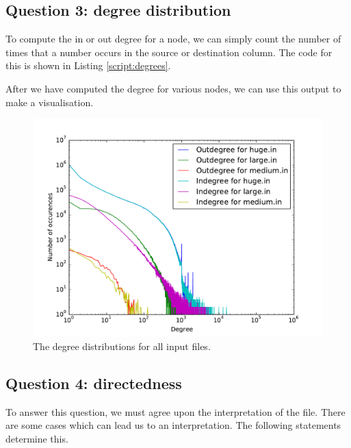 \documentclass[12pt,a4paper,hidelinks]{article}
\begin{document}
\subsection*{Question 3: degree distribution}

To compute the in or out degree for a node, we can simply count the number of times that a number occurs in the source or destination column. The code for this is shown in Listing \ref{script:degrees}.



After we have computed the degree for various nodes, we can use this output to make a visualisation.



\begin{figure}
	\centering
	\includegraphics[scale=0.83]{degree-distributions}
	\caption{The degree distributions for all input files.}
	\label{fig:degrees}
\end{figure}

\subsection*{Question 4: directedness}

To answer this question, we must agree upon the interpretation of the file. There are some cases which can lead us to an interpretation. The following statements determine this.
\end{document}
